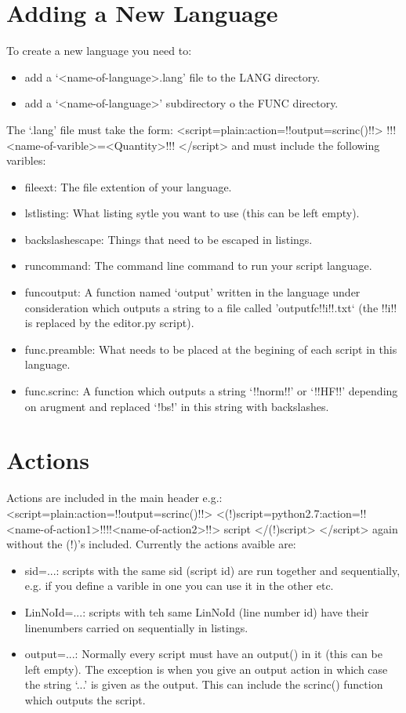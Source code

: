 \documentclass[a4paper,12pt,twocolum]{article}
\begin{document}
\section{Adding a New Language}
To create a new language you need to:
\begin{itemize}
\item add a `<name-of-language>.lang' file to the LANG directory.
\item add a `<name-of-language>' subdirectory o the FUNC directory.
\end{itemize}
The `.lang' file must take the form:
<script=plain:action={!!output=scrinc()!!}>
!!!<name-of-varible>={<Quantity>}!!!
</script>
and must include the following varibles:
\begin{itemize}
\item file\textunderscore ext: The file extention of your language.
\item lstlisting: What listing sytle you want to use (this can be left empty).
\item back\textunderscore slash\textunderscore escape: Things that need to be escaped in listings.
\item run\textunderscore command: The command line command to run your script language.
\item func\textunderscore output: A function named `output' written in the language under consideration which outputs a string to a file called 'outputfc\textunderscore !!i!!.txt` (the !!i!! is replaced by the editor.py script).
\item func.preamble: What needs to be placed at the begining of each script in this language.
\item func.scrinc: A function which outputs a string `!!norm!!' or `!!HF!!' depending on arugment and replaced `!bs!' in this string with backslashes.
\end{itemize}
\section{Actions}
Actions are included in the main header e.g.:
<script=plain:action={!!output=scrinc()!!}>
<(!)script=python2.7:action={!!<name-of-action1>!!!!<name-of-action2>!!}>
script
</(!)script>
</script>
again without the (!)'s included. Currently the actions avaible are:
\begin{itemize}
\item sid=...: scripts with the same sid (script id) are run together and sequentially, e.g. if you define a varible in one you can use it in the other etc.
\item LinNoId=...: scripts with teh same LinNoId (line number id) have their linenumbers carried on sequentially in listings.
\item output=...: Normally every script must have an output() in it (this can be left empty). The exception is when you give an output action in which case the string `...' is given as the output. This can include the scrinc() function which outputs the script.
\end{itemize}
\end{document}
